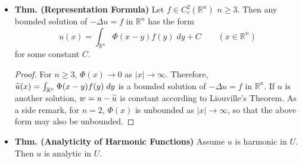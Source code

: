 \documentclass{article}
\begin{document}
\begin{itemize}
		\begin{proof}
			Fix $x_{0} \in \mathbb{R}^{n}$, $r > 0$, and let $B(x_{0}, r)$ be the ball of radius $r$ centered at $x_{0}$. To show that $u$ is constant, we just need to show that $Du \equiv 0$; connectedness of $\mathbb{R}^{n}$ will then show that $u$ is constant everywhere on $\mathbb{R}^{n}$. By the above estimates, one has 
			\begin{align*}
				\begin{split}
					|Du(x_{0})| &\leq \frac{2^{n + 1}n}{\alpha(n)r^{n + 1}}\norm{u}_{L^{1}(B(x_{0}, r))}  \\
					&= \frac{2^{n + 1}n}{\alpha(n)r^{n + 1}}\int_{B(x_{0},r)}|u(x)|\;dx \\
					&\leq \frac{2^{n + 1}n}{\alpha(n)r^{n + 1}}\int_{B(x_{0},r)}\norm{u}_{L^{\infty}(B(x_{0}, r))}\;dx \\
					&= \frac{2^{n + 1}n}{r}\norm{u}_{L^{\infty}(B(x_{0}, r))} \leq \frac{2^{n + 1}n}{r}\norm{u}_{L^{\infty}(\mathbb{R}^{n})}\xrightarrow{r \to \infty}0. 
				\end{split}
			\end{align*}
			Therefore, $Du \equiv 0$; by connectedness of $\mathbb{R}^{n}$, we conclude that $u$ is constant. 
		\end{proof}
		
		\item \textbf{Thm. (Representation Formula)} Let $f \in C_{c}^{2}(\mathbb{R}^{n})$ $n \geq 3$. Then any bounded solution of $-\Delta u = f$ in $\mathbb{R}^{n}$ has the form 
		\begin{equation*}
			u(x) = \int_{\mathbb{R}^{n}}\Phi(x - y)f(y)\;dy + C \qquad (x \in \mathbb{R}^{n})
		\end{equation*}
		for some constant $C$. 
		
		\begin{proof}
			For $n \geq 3$, $\Phi(x) \to 0$ as $|x| \to\infty$. Therefore, $\widetilde{u}(x) = \int_{\mathbb{R}^{n}}\Phi(x - y)f(y)\;dy$ is a bounded solution of $-\Delta u = f$ in $\mathbb{R}^{n}$. If $u$ is another solution, $w = u - \widetilde{u}$ is constant according to Liouville's Theorem. As a side remark, for $n = 2$, $\Phi(x)$ is unbounded as $|x| \to \infty$, so that the above form may also be unbounded. 
		\end{proof}
		
		\item \textbf{Thm. (Analyticity of Harmonic Functions)} Assume $u$ is harmonic in $U$. Then $u$ is analytic in $U$. 
		

\end{itemize}
\end{document}
